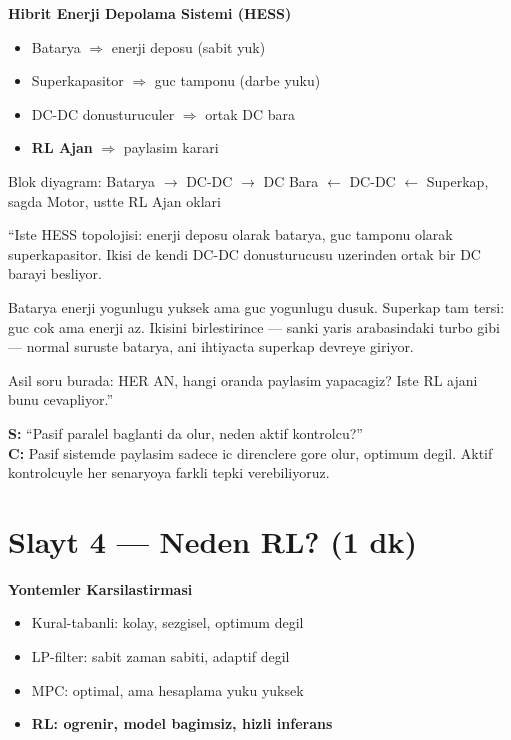 \documentclass[11pt,a4paper]{article}
\begin{document}
\begin{slytboks}
\textbf{Hibrit Enerji Depolama Sistemi (HESS)}
\begin{itemize}
\item Batarya $\Rightarrow$ enerji deposu (sabit yuk)
\item Superkapasitor $\Rightarrow$ guc tamponu (darbe yuku)
\item DC-DC donusturuculer $\Rightarrow$ ortak DC bara
\item \textbf{RL Ajan} $\Rightarrow$ paylasim karari
\end{itemize}
\end{slytboks}

\begin{gorselboks}
Blok diyagram: Batarya $\to$ DC-DC $\to$ DC Bara $\leftarrow$ DC-DC $\leftarrow$ Superkap, sagda Motor, ustte RL Ajan oklari
\end{gorselboks}

\begin{sayboks}
``Iste HESS topolojisi: enerji deposu olarak batarya, guc tamponu olarak superkapasitor. Ikisi de kendi DC-DC donusturucusu uzerinden ortak bir DC barayi besliyor.

Batarya enerji yogunlugu yuksek ama guc yogunlugu dusuk. Superkap tam tersi: guc cok ama enerji az. Ikisini birlestirince --- sanki yaris arabasindaki turbo gibi --- normal suruste batarya, ani ihtiyacta superkap devreye giriyor.

Asil soru burada: HER AN, hangi oranda paylasim yapacagiz? Iste RL ajani bunu cevapliyor.''
\end{sayboks}

\begin{soruboks}
\textbf{S:} ``Pasif paralel baglanti da olur, neden aktif kontrolcu?''\\
\textbf{C:} Pasif sistemde paylasim sadece ic direnclere gore olur, optimum degil. Aktif kontrolcuyle her senaryoya farkli tepki verebiliyoruz.
\end{soruboks}

\section{Slayt 4 --- Neden RL? (1 dk)}

\begin{slytboks}
\textbf{Yontemler Karsilastirmasi}
\begin{itemize}
\item Kural-tabanli: kolay, sezgisel, optimum degil
\item LP-filter: sabit zaman sabiti, adaptif degil
\item MPC: optimal, ama hesaplama yuku yuksek
\item \textbf{RL: ogrenir, model bagimsiz, hizli inferans}
\end{itemize}
\end{slytboks}
\end{document}
